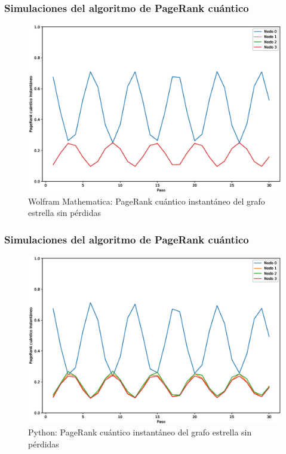 \documentclass[xetex,mathserif,serif, 8pt]{beamer}
\begin{document}
\begin{frame}
    \frametitle{Simulaciones del algoritmo de PageRank cuántico}

\begin{figure}[H]
    \centering
    \includegraphics[width=0.9\linewidth]{img/star-inst-M.eps}
    \caption{Wolfram Mathematica: PageRank cuántico instantáneo del grafo estrella sin pérdidas}
\end{figure}

\end{frame}

\begin{frame}
    \frametitle{Simulaciones del algoritmo de PageRank cuántico}

\begin{figure}[H]
    \centering
    \includegraphics[width=0.9\linewidth]{img/star-inst-lossless.eps}
    \caption{Python: PageRank cuántico instantáneo del grafo estrella sin pérdidas}
\end{figure}

\end{frame}
\end{document}
